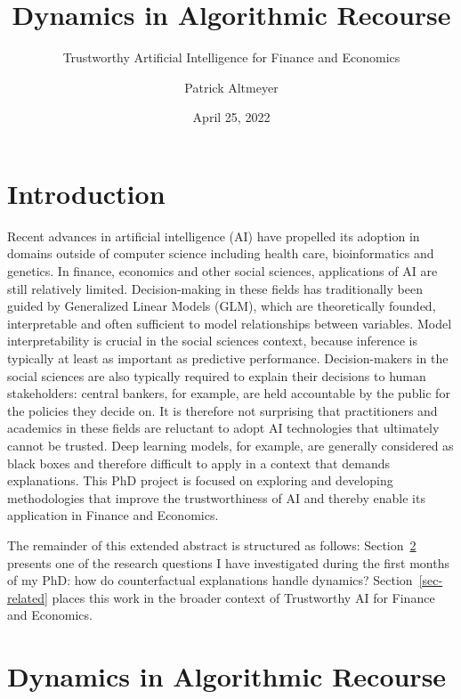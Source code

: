 \documentclass[
]{acmconf}
\title{Dynamics in Algorithmic Recourse}
\subtitle{Trustworthy Artificial Intelligence for Finance and Economics}
\author{Patrick Altmeyer}
\date{April 25, 2022}
\begin{document}
\maketitle

\ifdefined\Shaded\renewenvironment{Shaded}{\begin{tcolorbox}[borderline west={3pt}{0pt}{shadecolor}, boxrule=0pt, sharp corners, interior hidden, enhanced, breakable, frame hidden]}{\end{tcolorbox}}\fi

\hypertarget{introduction}{%
\section{Introduction}\label{introduction}}

Recent advances in artificial intelligence (AI) have propelled its
adoption in domains outside of computer science including health care,
bioinformatics and genetics. In finance, economics and other social
sciences, applications of AI are still relatively limited.
Decision-making in these fields has traditionally been guided by
Generalized Linear Models (GLM), which are theoretically founded,
interpretable and often sufficient to model relationships between
variables. Model interpretability is crucial in the social sciences
context, because inference is typically at least as important as
predictive performance. Decision-makers in the social sciences are also
typically required to explain their decisions to human stakeholders:
central bankers, for example, are held accountable by the public for the
policies they decide on. It is therefore not surprising that
practitioners and academics in these fields are reluctant to adopt AI
technologies that ultimately cannot be trusted. Deep learning models,
for example, are generally considered as black boxes and therefore
difficult to apply in a context that demands explanations. This PhD
project is focused on exploring and developing methodologies that
improve the trustworthiness of AI and thereby enable its application in
Finance and Economics.

The remainder of this extended abstract is structured as follows:
Section~\ref{sec-main} presents one of the research questions I have
investigated during the first months of my PhD: how do counterfactual
explanations handle dynamics? Section~\ref{sec-related} places this work
in the broader context of Trustworthy AI for Finance and Economics.

\hypertarget{sec-main}{%
\section{Dynamics in Algorithmic Recourse}\label{sec-main}}
\end{document}
